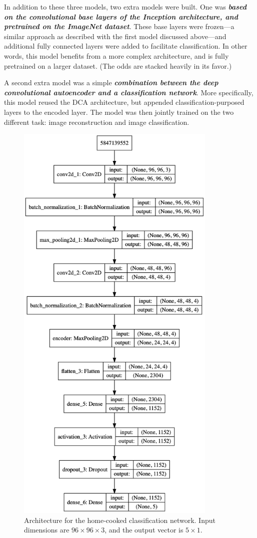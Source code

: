 In addition to these three models, two extra models were built. One was \textbf{\textsl{based on the convolutional base layers of the Inception architecture, and pretrained on the ImageNet dataset}}. These base layers were frozen---a similar approach as described with the first model discussed above---and additional fully connected layers were added to facilitate classification. In other words, this model benefits from a more complex architecture, and is fully pretrained on a larger dataset. (The odds are stacked heavily in its favor.)

A second extra model was a simple \textbf{\textsl{combination between the deep convolutional autoencoder and a classification network}}. More specifically, this model reused the DCA architecture, but appended classification-purposed layers to the encoded layer. The model was then jointly trained on the two different task: image reconstruction and image classification.

\begin{figure}[!htbp]
	\begin{center}
		\includegraphics[height=20cm, keepaspectratio]{images/class_architecture}
		\caption{Architecture for the home-cooked classification network. Input dimensions are $96 \times 96\times3$, and the output vector is $5\times1$.}
		\label{fig:class}
	\end{center}
\end{figure}




